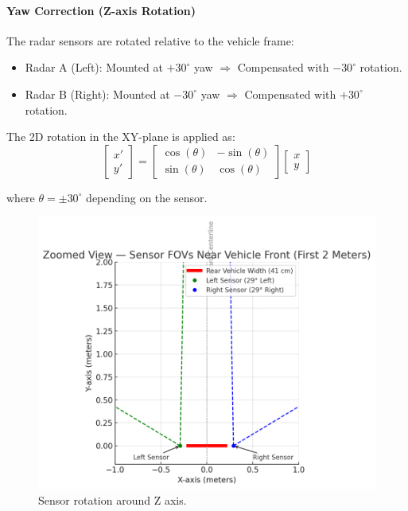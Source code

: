 \paragraph{Yaw Correction (Z-axis Rotation)}
The radar sensors are rotated relative to the vehicle frame:

\begin{itemize}
    \item Radar A (Left): Mounted at $+30^\circ$ yaw $\Rightarrow$ Compensated with $-30^\circ$ rotation.
    \item Radar B (Right): Mounted at $-30^\circ$ yaw $\Rightarrow$ Compensated with $+30^\circ$ rotation.
\end{itemize}

The 2D rotation in the XY-plane is applied as:
\[
\begin{bmatrix}
x' \\
y'
\end{bmatrix}
=
\begin{bmatrix}
\cos(\theta) & -\sin(\theta) \\
\sin(\theta) & \cos(\theta)
\end{bmatrix}
\begin{bmatrix}
x \\
y
\end{bmatrix}
\]

where $\theta = \pm30^\circ$ depending on the sensor.

\begin{figure}[!htbp]
    \centering
    \includegraphics[width=1.0\linewidth]{images/SensorsRotation.png}
    \caption{Sensor rotation around Z axis.}
    \label{fig: Z axis rotation}
\end{figure}

